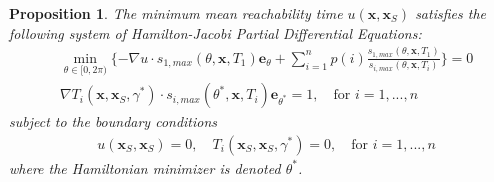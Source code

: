 \documentclass[10pt,a4paper]{amsart}
\newtheorem{proposition}{Proposition}
\def \be{{\mathbf {e}}}
\def \bx{{\mathbf {x}}}
\begin{document}
\begin{proposition}
The minimum mean reachability time $u(\bx,\bx_S)$ satisfies the following system of Hamilton-Jacobi Partial Differential Equations:
\begin{align}
    & \min_{\theta \in  [0, 2\pi)} \{ -\nabla u \cdot s_{1,max} (\theta, \bx, T_1) \be_\theta + \sum_{i=1}^{n} p(i) \frac{s_{1,max} (\theta, \bx, T_1)}{s_{i,max} (\theta, \bx, T_i)} \} = 0 \label{eqn:unc-hj}\\
    & \nabla T_i(\bx, \bx_S,\gamma^*) \cdot s_{i,max}(\theta^*,\bx, T_i)\be_{\theta^*} = 1 , \quad \text{for } i=1,...,n
    \label{eqn:det-hj}
\end{align}
subject to the boundary conditions
\begin{align}
    & u(\bx_S, \bx_S) = 0 , \quad T_i(\bx_S, \bx_S, \gamma^*) = 0, \quad \text{for } i=1,...,n \label{eqn:bc-hj}
\end{align}
where the Hamiltonian minimizer is denoted $\theta^*$.
\end{proposition}
\end{document}
